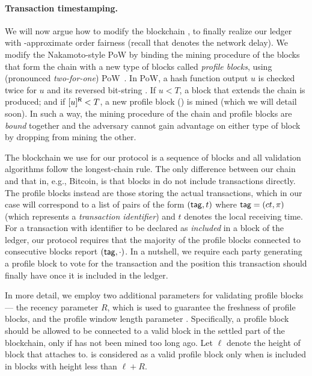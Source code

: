 \paragraph{Transaction timestamping.}
%
We will now argue how to modify the blockchain \chain, to finally realize our ledger with \delay-approximate order fairness (recall that \delay denotes the network delay).
%
We modify the Nakamoto-style PoW \chain by binding the mining procedure of the blocks that form the chain \chain with a new type of blocks called \emph{profile blocks}, using \twoforone (pronounced \emph{two-for-one}) PoW~\cite{EC:GarKiaLeo15}.
%
In \twoforone PoW, a hash function output $u$ is checked twice for $u$ and its reversed bit-string .
%
If $u< T$, a block that extends the chain \chain is produced; and if $[u]^{\mathsf{R}} < T$, a new profile block (\PB) is mined (which we will detail soon).
%
In such a way, the mining procedure of the chain \chain and profile blocks are \emph{bound} together and the adversary cannot gain advantage on either type of block by dropping from mining the other.

The blockchain \chain we use for our protocol is a sequence of blocks and all validation algorithms follow the longest-chain rule.
%
The only difference between our chain \chain and that in, e.g., Bitcoin, is that blocks in \chain do not include transactions directly.
%
The profile blocks instead are those storing the actual transactions, which in our case will correspond to a list of pairs of the form $(\mathsf{tag}, t)$ where $\mathsf{tag}=(ct, \pi)$ (which represents a \emph{transaction identifier}) and $t$ denotes the local receiving time.
%
For a transaction \tx with identifier \txTag to be declared as \emph{included} in a block \block of the ledger, our protocol requires that the majority of the profile blocks connected to \PBWindowLen consecutive blocks report $(\mathsf{tag}, \cdot)$.
%
In a nutshell, we require each party generating a profile block to vote for the transaction and the position this transaction should finally have once it is included in the ledger.

In more detail, we employ two additional parameters for validating profile blocks --- the recency parameter $R$, which is used to guarantee the freshness of profile blocks, and the profile window length parameter \PBWindowLen.
%
Specifically, a profile block \PB should be allowed to be connected to a valid block \block in the settled part of the blockchain, only if \PB has not been mined too long ago.
%
Let $\ell$ denote the height of block \block that \PB attaches to.
%
\PB is considered as a valid profile block only when \PB is included in blocks with height less than $\ell + R$.


